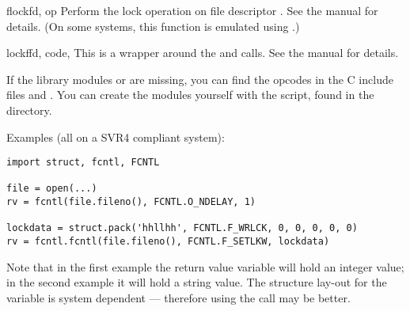 \begin{funcdesc}{flock}{fd, op}
Perform the lock operation  on file descriptor .
See the \UNIX{} manual  for details.  (On some
systems, this function is emulated using .)
\end{funcdesc}

\begin{funcdesc}{lockf}{fd, code, }
This is a wrapper around the  and
  calls.  See the \UNIX{}
manual for details.
\end{funcdesc}

If the library modules  or
 are missing, you can find the
opcodes in the C include files  and
.  You can create the modules yourself with the
 script, found in the  directory.


Examples (all on a SVR4 compliant system):

\begin{verbatim}
import struct, fcntl, FCNTL

file = open(...)
rv = fcntl(file.fileno(), FCNTL.O_NDELAY, 1)

lockdata = struct.pack('hhllhh', FCNTL.F_WRLCK, 0, 0, 0, 0, 0)
rv = fcntl.fcntl(file.fileno(), FCNTL.F_SETLKW, lockdata)
\end{verbatim}

Note that in the first example the return value variable  will
hold an integer value; in the second example it will hold a string
value.  The structure lay-out for the  variable is
system dependent --- therefore using the  call may be
better.
